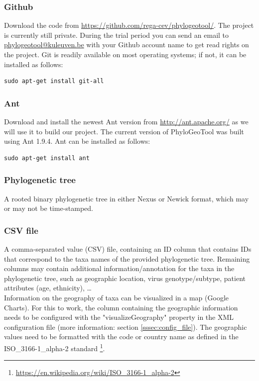 \documentclass[a4paper, 11pt]{article} %
\begin{document}
\subsubsection*{Github}
Download the code from \url{https://github.com/rega-cev/phylogeotool/}. 
The project is currently still private. 
During the trial period you can send an email to \href{mailto:phylogeotool@kuleuven.be}  {phylogeotool@kuleuven.be} with your Github account name to get read rights on the project.
Git is readily available on most operating systems; if not, it can be installed as follows:
\begin{verbatim}
sudo apt-get install git-all
\end{verbatim}

\subsubsection*{Ant}
Download and install the newest Ant version from \url{http://ant.apache.org/} as we will use it to build our project.
The current version of PhyloGeoTool was built using Ant 1.9.4.
Ant can be installed as follows:
\begin{verbatim}
sudo apt-get install ant
\end{verbatim}

\subsubsection*{Phylogenetic tree}
A rooted binary phylogenetic tree in either Nexus or Newick format, which may or may not be time-stamped.

\subsubsection*{CSV file}
A comma-separated value (CSV) file, containing an ID column that contains IDs that correspond to the taxa names of the provided phylogenetic tree.
Remaining columns may contain additional information/annotation for the taxa in the phylogenetic tree, such as geographic location, virus genotype/subtype, patient attributes (age, ethnicity), \ldots \\
Information on the geography of taxa can be visualized in a map (Google Charts). For this to work, the column containing the geographic information needs to be configured with the "visualizeGeography" property in the XML configuration file (more information: section \ref{sssec:config_file}). The geographic values need to be formatted with the code or country name as defined in the ISO\_3166-1\_alpha-2 standard \footnote{\url{https://en.wikipedia.org/wiki/ISO\_3166-1\_alpha-2}}.  
\end{document}
